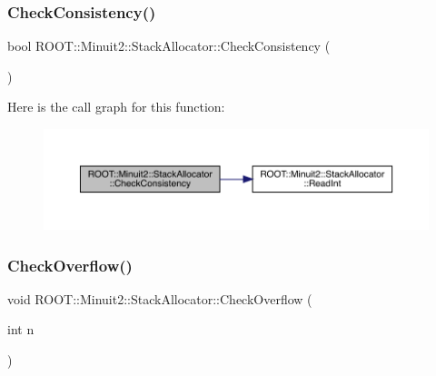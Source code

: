 \subsubsection{\texorpdfstring{CheckConsistency()}{CheckConsistency()}\hspace{0.1cm}{\footnotesize\ttfamily [2/2]}}
{\footnotesize\ttfamily bool R\+O\+O\+T\+::\+Minuit2\+::\+Stack\+Allocator\+::\+Check\+Consistency (\begin{DoxyParamCaption}{ }\end{DoxyParamCaption})\hspace{0.3cm}{\ttfamily [inline]}}

Here is the call graph for this function\+:
\nopagebreak
\begin{figure}[H]
\begin{center}
\leavevmode
\includegraphics[width=350pt]{d3/d1e/classROOT_1_1Minuit2_1_1StackAllocator_ad1189cdc76a07c36ef1924ad2488797d_cgraph}
\end{center}
\end{figure}
\mbox{\label{classROOT_1_1Minuit2_1_1StackAllocator_a96a7565f7b4bb269f740901eef54a97e}} 
\subsubsection{\texorpdfstring{CheckOverflow()}{CheckOverflow()}\hspace{0.1cm}{\footnotesize\ttfamily [1/2]}}
{\footnotesize\ttfamily void R\+O\+O\+T\+::\+Minuit2\+::\+Stack\+Allocator\+::\+Check\+Overflow (\begin{DoxyParamCaption}\item[{int}]{n }\end{DoxyParamCaption})\hspace{0.3cm}{\ttfamily [inline]}}

\mbox{\label{classROOT_1_1Minuit2_1_1StackAllocator_a96a7565f7b4bb269f740901eef54a97e}} 
